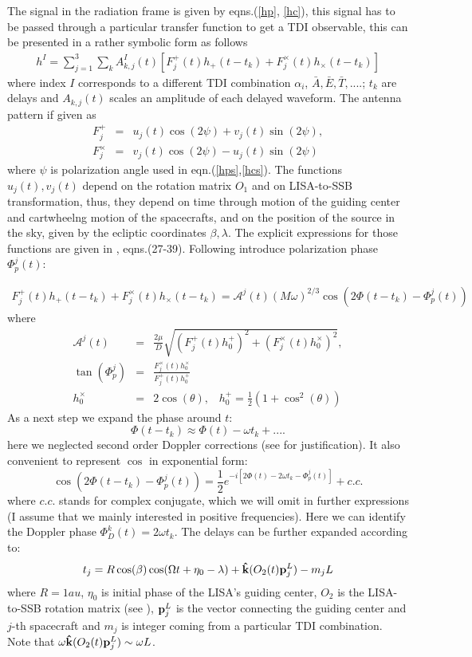 \documentclass[11pt]{report}
\def\be{\begin{equation}}
\def\bea{\begin{eqnarray}}
\def\en{\end{equation}}
\def\ena{\end{eqnarray}}
\def\bk{{\bf \hat{k}}}
\def\bp{{\bf p} }
\begin{document}
The signal in the radiation frame is given by eqns.(\ref{hp},
\ref{hc}), this signal has to be passed through a particular 
transfer function to get a TDI observable, this can be presented in a rather symbolic form as follows
\bea
h^{I} = \sum_{j=1}^{3}\sum_k A_{k,j}^{I}(t)\left[ 
F^{+}_j(t)h_{+}(t-t_k) + F^{\times}_{j}(t)h_{\times}(t-t_k)
\right]
\ena
where index $I$ corresponds to a different TDI combination $\alpha_i$,
$\bar{A}, \bar{E}, \bar{T},....$; $t_k$ are delays and $A_{k,j}(t)$
 scales an amplitude of each delayed waveform. The antenna pattern 
if given as 
\bea
F_j^{+} &=& u_j(t)\cos(2\psi) + v_j(t)\sin(2\psi),\\
F_j^{\times} &=& v_j(t)\cos(2\psi) - u_j(t)\sin(2\psi)
\ena
where $\psi$ is polarization angle used in eqn.(\ref{hps},\ref{hcs}). 
The functions $u_j(t), v_j(t)$ depend on the rotation matrix $O_1$
and on LISA-to-SSB transformation, thus, they depend on time through  motion of the guiding center and cartwheelng motion of the spacecrafts, and on the position of the source in the sky,
given by the ecliptic coordinates $\beta,\lambda$. The explicit 
expressions for those functions are given in \cite{KTV}, eqns.(27-39). 
Following \cite{Cutler} introduce polarization phase $\Phi_p^j(t)$:

\bea
F^{+}_j(t)h_{+}(t-t_k) + F^{\times}_{j}(t)h_{\times}(t-t_k) =
\mathcal{A}^j(t)(M\omega)^{2/3}\cos(2\Phi(t-t_k) -\Phi_p^j(t))
\ena
where
\bea
\mathcal{A}^j(t) &=& \frac{2\mu}{D} \sqrt{(F^{+}_j(t)h^{+}_0)^2 + 
(F^{\times}_{j}(t)h^{\times}_0)^2},\\
\tan(\Phi_p^j) &=& \frac{F^{\times}_{j}(t)h^{\times}_0}
{F^{+}_{j}(t)h^{+}_0}\\
h^{\times}_0 &=& 2\cos(\theta),\;\;\; 
h^{+}_0 = \frac1{2}(1 + \cos^2(\theta))
\ena
As a next step we expand the phase around $t$:
\be
\Phi(t - t_k) \approx \Phi(t) - \omega t_k +....
\en
here we neglected second order Doppler corrections (see \cite{Cutler}
for justification).
It also convenient to represent $\cos$ in exponential form:
\be
\cos(2\Phi(t-t_k) - \Phi_p^j(t)) = \frac1{2}
e^{-i\left[ 2\Phi(t) - 2\omega t_k  - \Phi_p^j(t)\right]} + c.c.
\en
where $c.c.$ stands for complex conjugate, which we will omit 
in further expressions (I assume that we mainly interested in 
positive frequencies).
Here we can identify the Doppler phase $\Phi^k_D(t) = 2\omega t_k$.
The delays can be further expanded according to:
\bea
t_j = R \cos(\beta) \cos(\Omega t + \eta_0 -\lambda) +
\bk(O_2(t)\bp_j^L) - m_jL
\ena
where $R=1au$, $\eta_0$ is initial phase of the LISA's guiding 
center, $O_2$ is the LISA-to-SSB rotation matrix (see \cite{KTV}),
$\bp^L_j$ is the vector connecting the guiding center and $j$-th spacecraft and $m_j$ is integer coming from a particular TDI combination. Note that $\omega \bk(O_2(t)\bp_j^L) \sim \omega L$.
\end{document}
